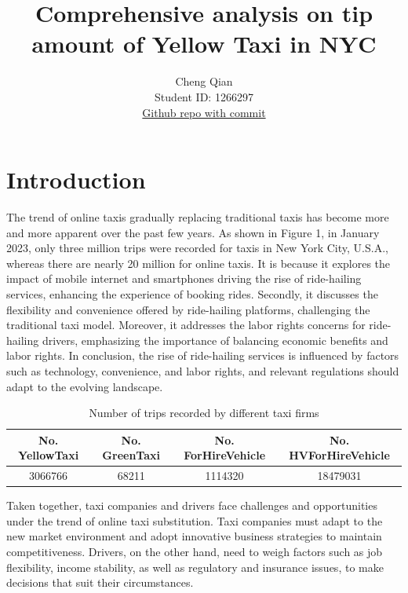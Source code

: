 \documentclass[11pt]{article}
\title{Comprehensive analysis on tip amount of Yellow Taxi in NYC}
\author{
Cheng Qian \\
Student ID: 1266297 \\
\href{https://github.com/ChrisQian6/MAST30034_Python}{Github repo with commit}
}
\begin{document}
\maketitle

\section{Introduction}

The trend of online taxis gradually replacing traditional taxis has become more and more apparent over the past few years. As shown in Figure 1, in January 2023, only three million trips were recorded for taxis in New York City, U.S.A., whereas there are nearly 20 million for online taxis. It is because it explores the impact of mobile internet and smartphones driving the rise of ride-hailing services, enhancing the experience of booking rides. Secondly, it discusses the flexibility and convenience offered by ride-hailing platforms, challenging the traditional taxi model. Moreover, it addresses the labor rights concerns for ride-hailing drivers, emphasizing the importance of balancing economic benefits and labor rights. In conclusion, the rise of ride-hailing services is influenced by factors such as technology, convenience, and labor rights, and relevant regulations should adapt to the evolving landscape.


\begin{table}[ht]
\centering
\begin{tabular}{|c|c|c|c|}
\hline
No. YellowTaxi & No. GreenTaxi & No. ForHireVehicle  & No. HVForHireVehicle\\
\hline
3066766 & 68211 & 1114320 & 18479031 \\
\hline
\end{tabular}
\caption{Number of trips recorded by different taxi firms}
\end{table}


Taken together, taxi companies and drivers face challenges and opportunities under the trend of online taxi substitution. Taxi companies must adapt to the new market environment and adopt innovative business strategies to maintain competitiveness. Drivers, on the other hand, need to weigh factors such as job flexibility, income stability, as well as regulatory and insurance issues, to make decisions that suit their circumstances.\cite{industry}
\end{document}
